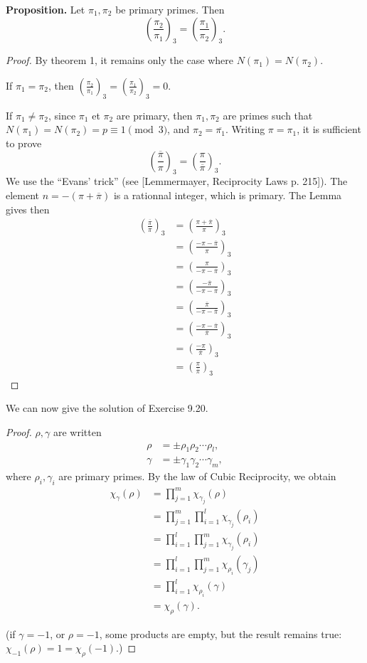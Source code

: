 \documentclass[11pt,a4paper]{article}
\newcommand{\legendre}[2]{\genfrac{(}{)}{}{}{#1}{#2}}
\begin{document}
\medskip

{\bf Proposition.}
Let $\pi_1,\pi_2$ be primary primes. Then
$$\legendre{\pi_2}{\pi_1}_3 = \legendre{\pi_1}{\pi_2}_3.$$


\begin{proof}
By theorem 1, it remains only the case where $N(\pi_1) = N(\pi_2)$.

If $\pi_1 = \pi_2$, then $\legendre{\pi_2}{\pi_1}_3 = \legendre{\pi_1}{\pi_2}_3 =0$.

If $\pi_1 \ne \pi_2$, since $\pi_1$ et $\pi_2$ are primary, then $\pi_1, \pi_2$ are primes such that $N(\pi_1) = N(\pi_2) = p \equiv 1 \pmod 3$, and $\pi_2 = \overline{\pi_1}$. Writing $\pi = \pi_1$, it is sufficient to prove
$$\legendre{\overline{\pi}}{\pi}_3 =  \legendre{\pi}{\overline{\pi}}_3.$$
We use the ``Evans' trick'' (see [Lemmermayer, Reciprocity Laws p. 215]). The element $n =-( \pi + \overline{\pi})$ is a  rationnal integer, which is primary. The Lemma gives then
\begin{align*}
\legendre{\overline{\pi}}{\pi}_3 &= \legendre{\pi + \overline{\pi}}{\pi}_3\\
&= \legendre{-\pi - \overline{\pi}}{\pi}_3\\
&= \legendre{\pi}{-\pi - \overline{\pi}}_3\\
&= \legendre{-\overline{\pi}}{-\pi - \overline{\pi}}_3\\
&=\legendre{\overline{\pi}}{-\pi - \overline{\pi}}_3\\
&=\legendre{-\pi  -\overline{\pi}}{\overline{\pi}}_3\\
&=\legendre{-\pi}{\overline{\pi}}_3\\
&=\legendre{\pi}{\overline{\pi}}_3
\end{align*}
\end{proof}

We can now give the solution of Exercise 9.20.
\begin{proof}


$\rho, \gamma$ are written
\begin{align*}
\rho&=\pm\rho_1\rho_2\cdots\rho_l,\\
\gamma &= \pm \gamma_1 \gamma_2\cdots \gamma_m, 
\end{align*}
 where $\rho_i,\gamma_i$ are primary primes.
By the law of Cubic Reciprocity, we obtain
\begin{align*}
\chi_\gamma(\rho) &= \prod_{j=1}^m \chi_{\gamma_j}(\rho)\\
& = \prod_{j=1}^m\prod_{i=1}^l \chi_{\gamma_j}(\rho_{i})\\
& = \prod_{i=1}^l\prod_{j=1}^m \chi_{\gamma_j}(\rho_{i})\\
& = \prod_{i=1}^l\prod_{j=1}^m \chi_{\rho_i}(\gamma_j)\\
&=\prod_{i=1}^l \chi_{\rho_i}(\gamma)\\
&=\chi_{\rho}( \gamma).
\end{align*}

(if $\gamma = -1$, or $\rho = -1$, some products are empty, but the result remains true: $\chi_{-1}(\rho) = 1 = \chi_{\rho}(-1)$.)



\end{proof}
\end{document}

